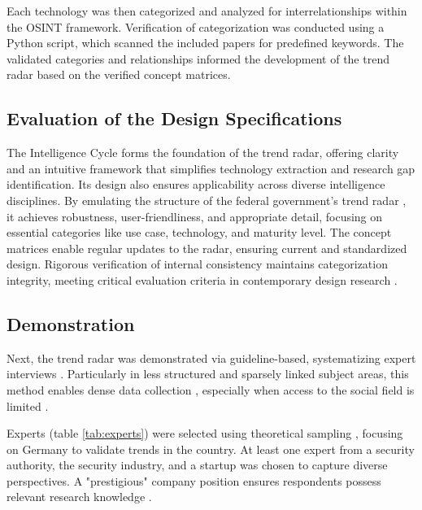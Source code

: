 \documentclass[10pt]{article}
\begin{document}
Each technology was then categorized and analyzed for interrelationships within the OSINT framework. Verification of categorization was conducted using a Python script, which scanned the included papers for predefined keywords. The validated categories and relationships informed the development of the trend radar based on the verified concept matrices.


\subsection{Evaluation of the Design Specifications}
The Intelligence Cycle forms the foundation of the trend radar, offering clarity and an intuitive framework that simplifies technology extraction and research gap identification. Its design also ensures applicability across diverse intelligence disciplines. By emulating the structure of the federal government's trend radar \cite{Stich.2022}, it achieves robustness, user-friendliness, and appropriate detail, focusing on essential categories like use case, technology, and maturity level. The concept matrices enable regular updates to the radar, ensuring current and standardized design. Rigorous verification of internal consistency maintains categorization integrity, meeting critical evaluation criteria in contemporary design research \cite{vomBrocke.2020b}.


\subsection{Demonstration}
Next, the trend radar was demonstrated via guideline-based, systematizing expert interviews \cite{Bogner.2014, Glaser.2009, Meuser.1991}. Particularly in less structured and sparsely linked subject areas, this method enables dense data collection \cite{Bogner.2014, Meuser.1991}, especially when access to the social field is limited \cite{Bogner.2002c, Glaser.2009}.

Experts (table \ref{tab:experts}) were selected using theoretical sampling \cite{Glaser.1967}, focusing on Germany to validate trends in the country. At least one expert from a security authority, the security industry, and a startup was chosen to capture diverse perspectives. A "prestigious" company position ensures respondents possess relevant research knowledge \cite{Bogner.2002b}.
\end{document}
